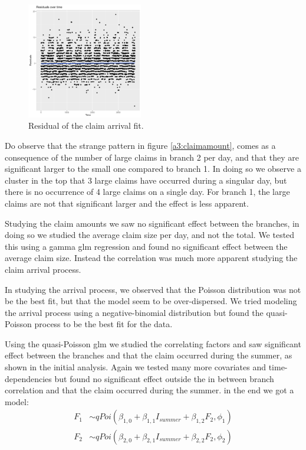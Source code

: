 \documentclass[11pt]{article}
\begin{document}
\begin{figure}
  \begin{center}
    \includegraphics[width=0.45\textwidth]{plots/covariance/count_residual_overTime.png}
  \end{center}
  \caption{Residual of the claim arrival fit.}
  \label{a3:residual}
\end{figure}

Do observe that the strange pattern in figure \ref{a3:claimamount}, comes as a consequence of the number of large claims in branch 2 per day, and that they are significant larger to the small one compared to branch 1. 
In doing so we observe a cluster in the top that 3 large claims have occurred during a singular day, but there is no occurrence of 4 large claims on a single day.
For branch 1, the large claims are not that significant larger and the effect is less apparent.

Studying the claim amounts we saw no significant effect between the branches, in doing so we studied the average claim size per day, and not the total.
We tested this using a gamma glm regression and found no significant effect between the average claim size.
Instead the correlation was much more apparent studying the claim arrival process.

In studying the arrival process, we observed that the Poisson distribution was not be the best fit, but that the model seem to be over-dispersed.
We tried modeling the arrival process using a negative-binomial distribution but found the quasi-Poisson process to be the best fit for the data.

Using the quasi-Poisson glm we studied the correlating factors and saw significant effect between the branches and that the claim occurred during the summer, as shown in the initial analysis. 
Again we tested many more covariates and time-dependencies but found no significant effect outside the in between branch correlation and that the claim occurred during the summer.
in the end we got a model:
\begin{equation}
    \begin{split}
       F_{1} &\sim qPoi(\beta_{1,0}+\beta_{1,1}I_{summer}+\beta_{1,2}F_2,\phi_1)\\
       F_{2} &\sim qPoi(\beta_{2,0}+\beta_{2,1}I_{summer}+\beta_{2,2}F_2,\phi_2)
\end{split}
\label{a3:formula}
\end{equation}
\end{document}
